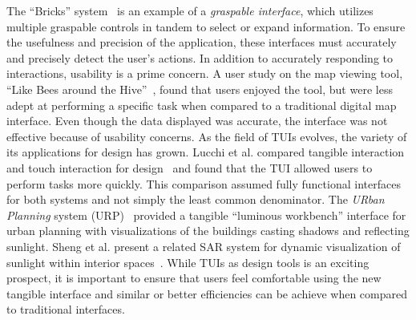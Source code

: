 \documentclass{article}
\begin{document}
%
The ``Bricks'' system~\cite{223964} is an example of a {\em graspable
  interface}, which utilizes multiple graspable controls in tandem to
select or expand information.  To ensure the usefulness and precision
of the application, these interfaces must accurately and precisely
detect the user's actions.
%
In addition to accurately responding to interactions, usability is a
prime concern.  A user study on the map viewing tool, ``Like Bees
around the Hive''~\cite{1518991}, found that users enjoyed the tool,
but were less adept at performing a specific task when compared to a
traditional digital map interface.  Even though the data displayed was
accurate, the interface was not effective because of usability
concerns.  
%
%
As the field of TUIs evolves, the variety of its applications for
design has grown.  Lucchi et al. compared tangible interaction and
touch interaction for design~\cite{1709917} and found that the TUI
allowed users to perform tasks more quickly.  This comparison assumed
fully functional interfaces for both systems and not simply the least
common denominator.  
%
%
The {\em URban Planning} system
(URP)~\cite{Underkoffler:1999:ULW:302979.303114} provided a tangible
``luminous workbench'' interface for urban planning with
visualizations of the buildings casting shadows and reflecting
sunlight.
%
Sheng et al. present a related SAR system for dynamic
visualization of sunlight within interior spaces~\cite{sheng_TVCG}.
%
%
While TUIs as design tools is an exciting prospect, it is important to
ensure that users feel comfortable using the new tangible interface
and similar or better efficiencies can be achieve when compared to
traditional interfaces.
\end{document}
